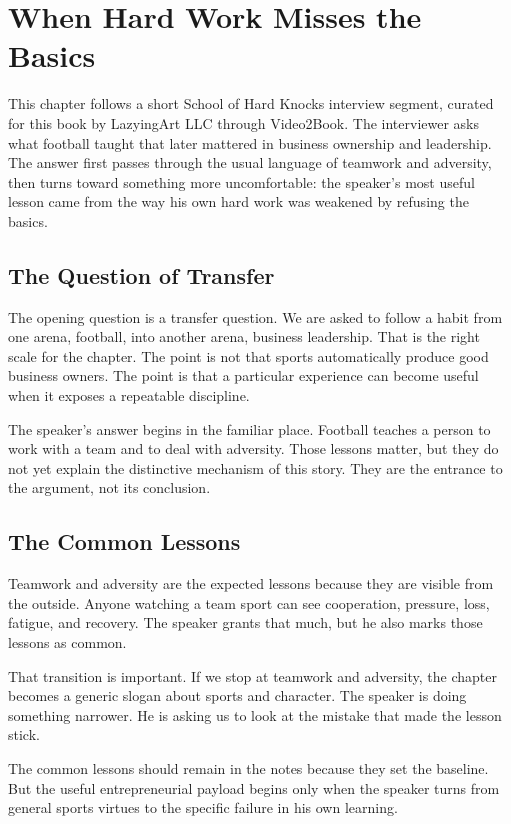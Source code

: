 \chapter{When Hard Work Misses the Basics}

This chapter follows a short School of Hard Knocks interview segment, curated for this book by LazyingArt LLC through Video2Book. The interviewer asks what football taught that later mattered in business ownership and leadership. The answer first passes through the usual language of teamwork and adversity, then turns toward something more uncomfortable: the speaker's most useful lesson came from the way his own hard work was weakened by refusing the basics.

\section{The Question of Transfer}

The opening question is a transfer question. We are asked to follow a habit from one arena, football, into another arena, business leadership. That is the right scale for the chapter. The point is not that sports automatically produce good business owners. The point is that a particular experience can become useful when it exposes a repeatable discipline.

The speaker's answer begins in the familiar place. Football teaches a person to work with a team and to deal with adversity. Those lessons matter, but they do not yet explain the distinctive mechanism of this story. They are the entrance to the argument, not its conclusion.

\section{The Common Lessons}

Teamwork and adversity are the expected lessons because they are visible from the outside. Anyone watching a team sport can see cooperation, pressure, loss, fatigue, and recovery. The speaker grants that much, but he also marks those lessons as common.

That transition is important. If we stop at teamwork and adversity, the chapter becomes a generic slogan about sports and character. The speaker is doing something narrower. He is asking us to look at the mistake that made the lesson stick.

\begin{remark}
The common lessons should remain in the notes because they set the baseline. But the useful entrepreneurial payload begins only when the speaker turns from general sports virtues to the specific failure in his own learning.
\end{remark}

